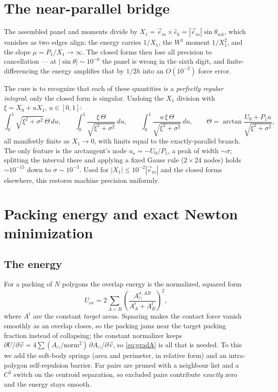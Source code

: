 \documentclass[11pt]{article}
\numberwithin{equation}{section}
\newcommand{\vv}[1]{\vec{#1}}
\begin{document}
\section{The near-parallel bridge}\label{sec:bridge}

The assembled panel and moments divide by $X_1=\vv e_m\!\times\!\hat e_k=|\vv e_m|\sin\theta_{mk}$,
which vanishes as two edges align: the energy carries $1/X_1$, the $W^1$ moment $1/X_1^2$, and the
slope $\mu=P_1/X_1\to\infty$. The closed forms then lose all precision to cancellation --- at
$|\sin\theta|\sim10^{-6}$ the panel is wrong in the sixth digit, and finite-differencing the energy
amplifies that by $1/2h$ into an $O(10^{-2})$ force error.

The cure is to recognize that each of these quantities is a \emph{perfectly regular integral}; only the
closed form is singular. Undoing the $X_1$ division with $\xi=X_0+u X_1$, $u\in[0,1]$:
\begin{equation}\label{eq:bridge}
  \int_0^1\!\sqrt{\xi^2+\sigma^2}\,\Theta\,du,\qquad
  \int_0^1\!\frac{\xi\,\Theta}{\sqrt{\xi^2+\sigma^2}}\,du,\qquad
  \int_0^1\!\frac{u\,\xi\,\Theta}{\sqrt{\xi^2+\sigma^2}}\,du,
  \qquad \Theta=\arctan\frac{U_0+P_1u}{\sqrt{\xi^2+\sigma^2}},
\end{equation}
all manifestly finite as $X_1\to0$, with limits equal to the exactly-parallel branch. The only feature
is the arctangent's node $u_\star=-U_0/P_1$, a peak of width $\sim\sigma$; splitting the interval there
and applying a fixed Gauss rule ($2\times24$ nodes) holds $\sim10^{-15}$ down to $\sigma\sim10^{-3}$.
Used for $|X_1|\le10^{-2}|\vv e_m|$ and the closed forms elsewhere, this restores machine precision
uniformly.

\section{Packing energy and exact Newton minimization}\label{sec:newton}

\subsection{The energy}
For a packing of $N$ polygons the overlap energy is the normalized, squared form
\begin{equation}\label{eq:U}
  U_{\text{ov}}=2\sum_{A<B}\left(\frac{A_\cap^{\sigma,AB}}{A_A^{t}+A_B^{t}}\right)^{\!2},
\end{equation}
where $A^t$ are the constant \emph{target} areas. Squaring makes the contact force vanish smoothly as
an overlap closes, so the packing jams near the target packing fraction instead of collapsing; the
constant normalizer keeps $\partial U/\partial\vv v=4\sum(A_\cap/\text{norm}^2)\,\partial A_\cap/\partial\vv v$,
so \eqref{eq:gradA} is all that is needed. To this we add the soft-body springs (area and perimeter,
in relative form) and an intra-polygon self-repulsion barrier. Far pairs are pruned with a neighbour
list and a $C^2$ switch on the centroid separation, so excluded pairs contribute \emph{exactly} zero
and the energy stays smooth.
\end{document}
